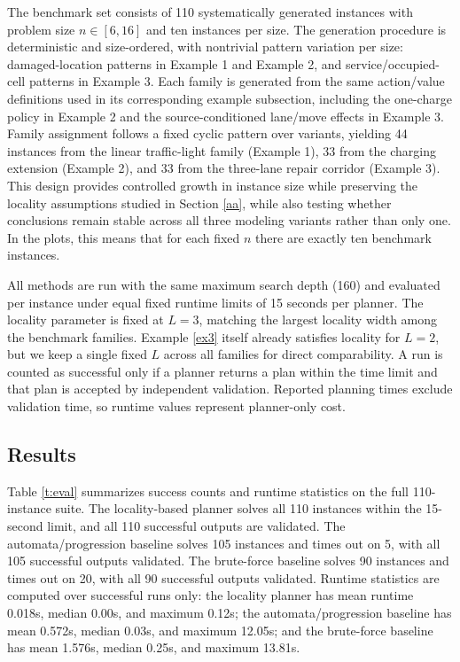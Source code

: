 \documentclass[]{jair}
\begin{document}
The benchmark set consists of 110 systematically generated instances with problem size $n\in[6,16]$ and ten instances per size. The generation procedure is deterministic and size-ordered, with nontrivial pattern variation per size: damaged-location patterns in Example 1 and Example 2, and service/occupied-cell patterns in Example 3. Each family is generated from the same action/value definitions used in its corresponding example subsection, including the one-charge policy in Example 2 and the source-conditioned lane/move effects in Example 3. Family assignment follows a fixed cyclic pattern over variants, yielding 44 instances from the linear traffic-light family (Example 1), 33 from the charging extension (Example 2), and 33 from the three-lane repair corridor (Example 3). This design provides controlled growth in instance size while preserving the locality assumptions studied in Section \ref{aa}, while also testing whether conclusions remain stable across all three modeling variants rather than only one. In the plots, this means that for each fixed $n$ there are exactly ten benchmark instances.

All methods are run with the same maximum search depth (160) and evaluated per instance under equal fixed runtime limits of 15 seconds per planner. The locality parameter is fixed at $L=3$, matching the largest locality width among the benchmark families. Example \ref{ex3} itself already satisfies locality for $L=2$, but we keep a single fixed $L$ across all families for direct comparability. A run is counted as successful only if a planner returns a plan within the time limit and that plan is accepted by independent validation. Reported planning times exclude validation time, so runtime values represent planner-only cost.

\subsection{Results}

Table \ref{t:eval} summarizes success counts and runtime statistics on the full 110-instance suite. The locality-based planner solves all 110 instances within the 15-second limit, and all 110 successful outputs are validated. The automata/progression baseline solves 105 instances and times out on 5, with all 105 successful outputs validated. The brute-force baseline solves 90 instances and times out on 20, with all 90 successful outputs validated. Runtime statistics are computed over successful runs only: the locality planner has mean runtime 0.018s, median 0.00s, and maximum 0.12s; the automata/progression baseline has mean 0.572s, median 0.03s, and maximum 12.05s; and the brute-force baseline has mean 1.576s, median 0.25s, and maximum 13.81s.
\end{document}

